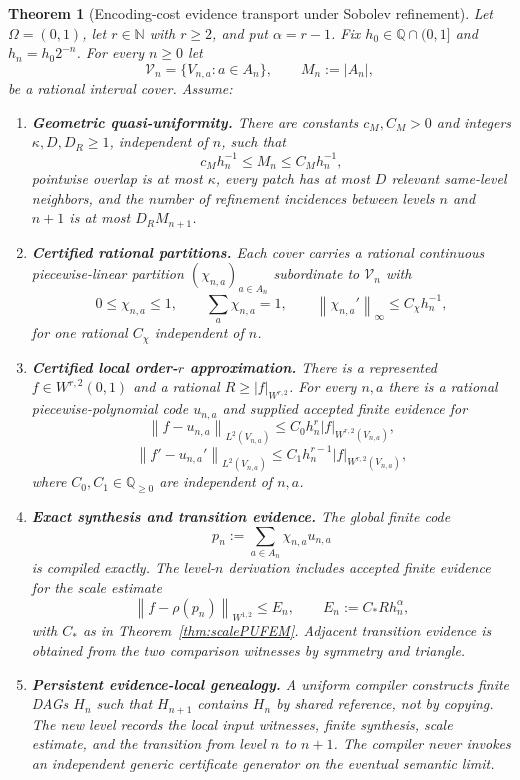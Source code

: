 \documentclass[11pt]{article}
\newtheorem{theorem}{Theorem}[section]
\theoremstyle{definition}
\newcommand{\norm}[1]{\left\lVert #1 \right\rVert}
\newcommand{\N}{\mathbb{N}}
\newcommand{\Q}{\mathbb{Q}}
\begin{document}
\begin{theorem}[Encoding-cost evidence transport under Sobolev refinement]\label{thm:orderneutral}
Let $\Omega=(0,1)$, let $r\in\N$ with $r\ge2$, and put $\alpha=r-1$.
Fix $h_0\in\Q\cap(0,1]$ and $h_n=h_0 2^{-n}$.  For every $n\ge0$ let
\[
 \mathcal V_n=\{V_{n,a}:a\in A_n\},\qquad M_n:=|A_n|,
\]
be a rational interval cover.  Assume:
\begin{enumerate}[label=(H\arabic*)]
\item \textbf{Geometric quasi-uniformity.} There are constants $c_M,C_M>0$ and
integers $\kappa,D,D_R\ge1$, independent of $n$, such that
\[
 c_Mh_n^{-1}\le M_n\le C_Mh_n^{-1},
\]
pointwise overlap is at most $\kappa$, every patch has at most $D$ relevant same-level
neighbors, and the number of refinement incidences between levels $n$ and $n+1$ is at
most $D_RM_{n+1}$.

\item \textbf{Certified rational partitions.} Each cover carries a rational continuous
piecewise-linear partition $(\chi_{n,a})_{a\in A_n}$ subordinate to $\mathcal V_n$ with
\[
 0\le\chi_{n,a}\le1,\qquad
 \sum_a\chi_{n,a}=1,\qquad
 \norm{\chi_{n,a}'}_\infty\le C_\chi h_n^{-1},
\]
for one rational $C_\chi$ independent of $n$.

\item \textbf{Certified local order-$r$ approximation.} There is a represented
$f\in W^{r,2}(0,1)$ and a rational $R\ge |f|_{W^{r,2}}$.  For every $n,a$ there is a
rational piecewise-polynomial code $u_{n,a}$ and supplied accepted finite evidence for
\[
 \norm{f-u_{n,a}}_{L^2(V_{n,a})}
 \le C_0h_n^r |f|_{W^{r,2}(V_{n,a})},
\]
\[
 \norm{f'-u_{n,a}'}_{L^2(V_{n,a})}
 \le C_1h_n^{r-1}|f|_{W^{r,2}(V_{n,a})},
\]
where $C_0,C_1\in\Q_{\ge0}$ are independent of $n,a$.

\item \textbf{Exact synthesis and transition evidence.} The global finite code
\[
 p_n:=\sum_{a\in A_n}\chi_{n,a}u_{n,a}
\]
is compiled exactly.  The level-$n$ derivation includes accepted finite evidence for the
scale estimate
\[
 \norm{f-\rho(p_n)}_{W^{1,2}}\le E_n,
 \qquad
 E_n:=C_*R h_n^{\alpha},
\]
with $C_*$ as in Theorem~\ref{thm:scalePUFEM}.  Adjacent transition evidence is obtained
from the two comparison witnesses by symmetry and triangle.

\item \textbf{Persistent evidence-local genealogy.} A uniform compiler constructs finite
DAGs $H_n$ such that $H_{n+1}$ contains $H_n$ by shared reference, not by copying.  The
new level records the local input witnesses, finite synthesis, scale estimate, and the
transition from level $n$ to $n+1$.  The compiler never invokes an independent generic
certificate generator on the eventual semantic limit.


\end{enumerate}
\end{theorem}
\end{document}
